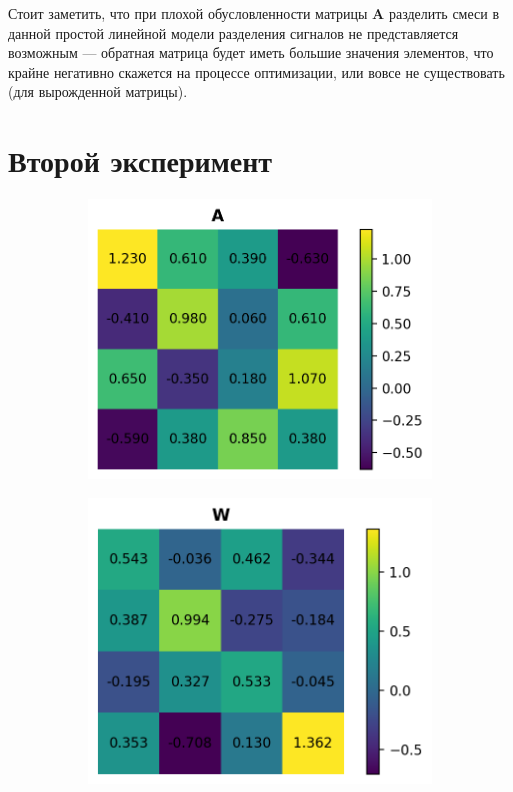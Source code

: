 \documentclass[a4paper,12pt]{article}
\begin{document}
	Стоит заметить, что при плохой обусловленности матрицы $\mathbf{A}$ разделить смеси в данной простой линейной модели разделения сигналов не представляется возможным --- обратная матрица будет иметь большие значения элементов, что крайне негативно скажется на процессе оптимизации, или вовсе не существовать (для вырожденной матрицы).
	
	\newpage
	\section*{Второй эксперимент}
	\begin{figure}[h!]
		\centering
		\begin{subfigure}{0.3\linewidth}
			\includegraphics[width=\linewidth]{plots/A2}
		\end{subfigure}
		\begin{subfigure}{0.3\linewidth}
			\includegraphics[width=\linewidth]{plots/W2}

\end{subfigure}
\end{figure}
\end{document}
